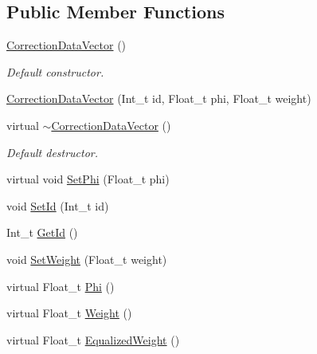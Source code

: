 \subsection*{Public Member Functions}
\begin{DoxyCompactItemize}
\item 
\mbox{\label{classQn_1_1CorrectionDataVector_a7fa749ad57305d5cf00076824a3a3fbc}} 
\mbox{\hyperlink{classQn_1_1CorrectionDataVector_a7fa749ad57305d5cf00076824a3a3fbc}{Correction\+Data\+Vector}} ()
\begin{DoxyCompactList}\small\item\em Default constructor. \end{DoxyCompactList}\item 
\mbox{\hyperlink{classQn_1_1CorrectionDataVector_afcdf4cec34dca08e9c567af6ecce00cf}{Correction\+Data\+Vector}} (Int\+\_\+t id, Float\+\_\+t phi, Float\+\_\+t weight)
\item 
\mbox{\label{classQn_1_1CorrectionDataVector_ab78ea3730f98447536f86f4f7665efcd}} 
virtual \mbox{\hyperlink{classQn_1_1CorrectionDataVector_ab78ea3730f98447536f86f4f7665efcd}{$\sim$\+Correction\+Data\+Vector}} ()
\begin{DoxyCompactList}\small\item\em Default destructor. \end{DoxyCompactList}\item 
virtual void \mbox{\hyperlink{classQn_1_1CorrectionDataVector_aa2d415fd11a858c3c32c3fd820889bdc}{Set\+Phi}} (Float\+\_\+t phi)
\item 
void \mbox{\hyperlink{classQn_1_1CorrectionDataVector_a62c233a19220b9447412b6fb758a5732}{Set\+Id}} (Int\+\_\+t id)
\item 
Int\+\_\+t \mbox{\hyperlink{classQn_1_1CorrectionDataVector_a14c8e1a91eaeaff1fec89e80d715d07d}{Get\+Id}} ()
\item 
void \mbox{\hyperlink{classQn_1_1CorrectionDataVector_a4d71cb8911dd32d76ebc67250c24bac6}{Set\+Weight}} (Float\+\_\+t weight)
\item 
virtual Float\+\_\+t \mbox{\hyperlink{classQn_1_1CorrectionDataVector_a7b27c82f17e502100d8c83c642a161ec}{Phi}} ()
\item 
virtual Float\+\_\+t \mbox{\hyperlink{classQn_1_1CorrectionDataVector_a5fa5b765bd15afd5b5b7773ddb724e8e}{Weight}} ()
\item 
virtual Float\+\_\+t \mbox{\hyperlink{classQn_1_1CorrectionDataVector_a5c4b2b16cc814104974748db21a4cab5}{Equalized\+Weight}} ()
\end{DoxyCompactItemize}
